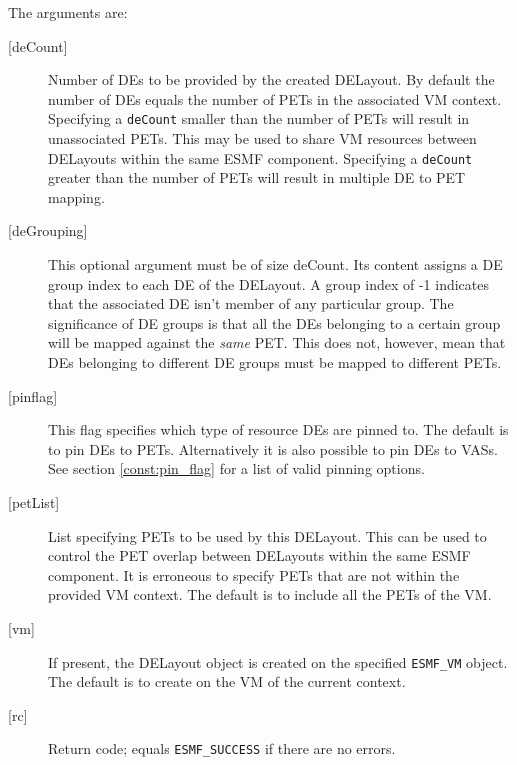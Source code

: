        The arguments are:
       \begin{description}
       \item[{[deCount]}]
            Number of DEs to be provided by the created DELayout. By default
            the number of DEs equals the number of PETs in the associated VM
            context. Specifying a {\tt deCount} smaller than the number
            of PETs will result in unassociated PETs.
            This may be used to share VM resources between DELayouts within the
            same ESMF component. Specifying a {\tt deCount} greater than the 
            number of PETs will result in multiple DE to PET mapping.
       \item[{[deGrouping]}]
            This optional argument must be of size deCount. Its content assigns
            a DE group index to each DE of the DELayout. A group index of -1 
            indicates that the associated DE isn't member of any particular 
            group. The significance of DE groups is that all the DEs belonging
            to a certain group will be mapped against the {\em same} PET. This
            does not, however, mean that DEs belonging to different DE groups 
            must be mapped to different PETs.
       \item[{[pinflag]}]
            This flag specifies which type of resource DEs are pinned to. 
            The default is to pin DEs to PETs. Alternatively it is
            also possible to pin DEs to VASs. See section 
            \ref{const:pin_flag} for a list of valid pinning options.
       \item[{[petList]}]
            List specifying PETs to be used by this DELayout. This can be used
            to control the PET overlap between DELayouts within the same
            ESMF component. It is erroneous to specify PETs that are not within 
            the provided VM context. The default is to include all the PETs of
            the VM.
       \item[{[vm]}]
            If present, the DELayout object is created on the specified 
            {\tt ESMF\_VM} object. The default is to create on the VM of the 
            current context.
       \item[{[rc]}]
            Return code; equals {\tt ESMF\_SUCCESS} if there are no errors.
       \end{description}
   
 
\mbox{}\hrulefill\ 
 

